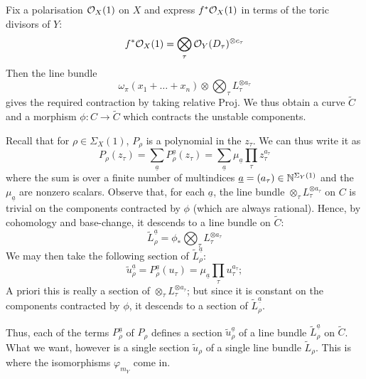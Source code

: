 Fix a polarisation $\mathcal{O}_X(1)$ on $X$ and express $f^*\mathcal{O}_X(1)$ in terms of the toric divisors of $Y$:
\begin{equation*} f^*\mathcal{O}_X(1) = \bigotimes_\tau \mathcal{O}_Y(D_\tau)^{\otimes c_\tau} \end{equation*}
Then the line bundle
\begin{equation*} \omega_{\pi}(x_1+\ldots+x_n)\otimes \bigotimes_\tau L_\tau^{\otimes a_\tau} \end{equation*}
gives the required contraction by taking relative Proj. We thus obtain a curve $\tilde{C}$ and a morphism $\phi : C \to \tilde{C}$ which contracts the unstable components.

Recall that for $\rho \in \Sigma_X(1)$, $P_\rho$ is a polynomial in the $z_\tau$. We can thus write it as
\begin{equation} \label{Prho} P_\rho(z_\tau) = \sum_{\underline{a}} P_\rho^{\underline{a}}(z_\tau) = \sum_{\underline{a}} \mu_{\underline{a}} \prod_{\tau} z_{\tau}^{a_{\tau}} \end{equation}
where the sum is over a finite number of multindices $\underline{a} = (a_\tau) \in \mathbb{N}^{\Sigma_Y(1)}$ and the $\mu_{\underline{a}}$ are nonzero scalars. Observe that, for each $\underline{a}$, the line bundle $\otimes_\tau  L_\tau^{\otimes a_\tau}$ on $C$ is trivial on the components contracted by $\phi$ (which are always rational). Hence, by cohomology and base-change, it descends to a line bundle on $\tilde{C}$:
\begin{equation*} \tilde{L}_\rho^{\underline{a}} =\phi_* \bigotimes_\tau L_\tau^{\otimes a_\tau} \end{equation*}
We may then take the following section of $\tilde{L}_\rho^{\underline{a}}$:
\begin{equation*} \tilde{u}_\rho^{\underline{a}} = P_\rho^{\underline{a}}(u_\tau) = \mu_{\underline{a}} \prod_\tau u_\tau^{a_\tau}; \end{equation*}
A priori this is really a section of $\otimes_\tau L_\tau^{\otimes a_\tau}$; but since it is constant on the components contracted by $\phi$, it descends to a section of $\tilde{L}_\rho^{\underline{a}}$.

Thus, each of the terms $P_\rho^{\underline{a}}$ of $P_\rho$ defines a section $\tilde{u}_\rho^{\underline{a}}$ of a line bundle $\tilde{L}_\rho^{\underline{a}}$ on $\tilde{C}$. What we want, however is a single section $\tilde{u}_\rho$ of a single line bundle $\tilde{L}_\rho$. This is where the isomorphisms $\varphi_{m_Y}$ come in.

